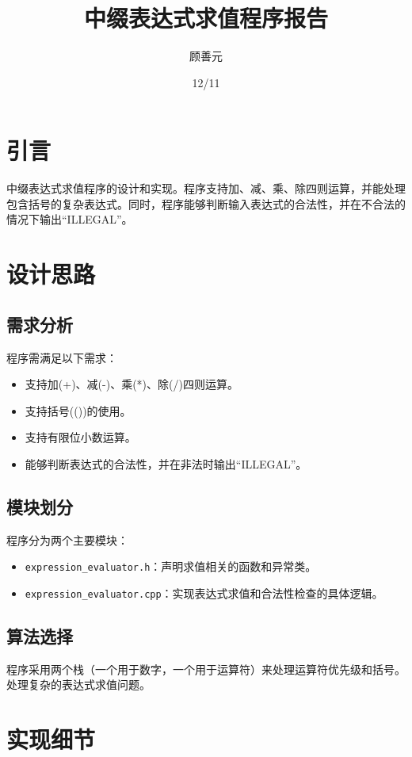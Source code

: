 \documentclass{article}
\title{中缀表达式求值程序报告}
\author{顾善元}
\date{12/11}
\begin{document}
\maketitle

\section{引言}
中缀表达式求值程序的设计和实现。程序支持加、减、乘、除四则运算，并能处理包含括号的复杂表达式。同时，程序能够判断输入表达式的合法性，并在不合法的情况下输出“ILLEGAL”。

\section{设计思路}

\subsection{需求分析}
程序需满足以下需求：
\begin{itemize}
  \item 支持加(+)、减(-)、乘(*)、除(/)四则运算。
  \item 支持括号(())的使用。
  \item 支持有限位小数运算。
  \item 能够判断表达式的合法性，并在非法时输出“ILLEGAL”。
\end{itemize}

\subsection{模块划分}
程序分为两个主要模块：
\begin{itemize}
  \item \texttt{expression\_evaluator.h}：声明求值相关的函数和异常类。
  \item \texttt{expression\_evaluator.cpp}：实现表达式求值和合法性检查的具体逻辑。
\end{itemize}

\subsection{算法选择}
程序采用两个栈（一个用于数字，一个用于运算符）来处理运算符优先级和括号。处理复杂的表达式求值问题。

\section{实现细节}
\end{document}
